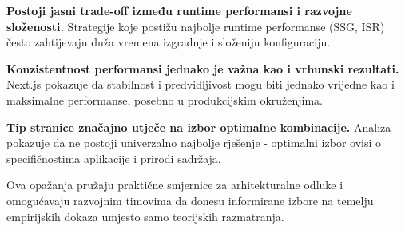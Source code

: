 \textbf{Postoji jasni trade-off između runtime performansi i razvojne složenosti.} Strategije koje postižu najbolje runtime performanse (SSG, ISR) često zahtijevaju duža vremena izgradnje i složeniju konfiguraciju.

\textbf{Konzistentnost performansi jednako je važna kao i vrhunski rezultati.} Next.js pokazuje da stabilnost i predvidljivost mogu biti jednako vrijedne kao i maksimalne performanse, posebno u produkcijskim okruženjima.

\textbf{Tip stranice značajno utječe na izbor optimalne kombinacije.} Analiza pokazuje da ne postoji univerzalno najbolje rješenje - optimalni izbor ovisi o specifičnostima aplikacije i prirodi sadržaja.

Ova opažanja pružaju praktične smjernice za arhitekturalne odluke i omogućavaju razvojnim timovima da donesu informirane izbore na temelju empirijskih dokaza umjesto samo teorijskih razmatranja.
